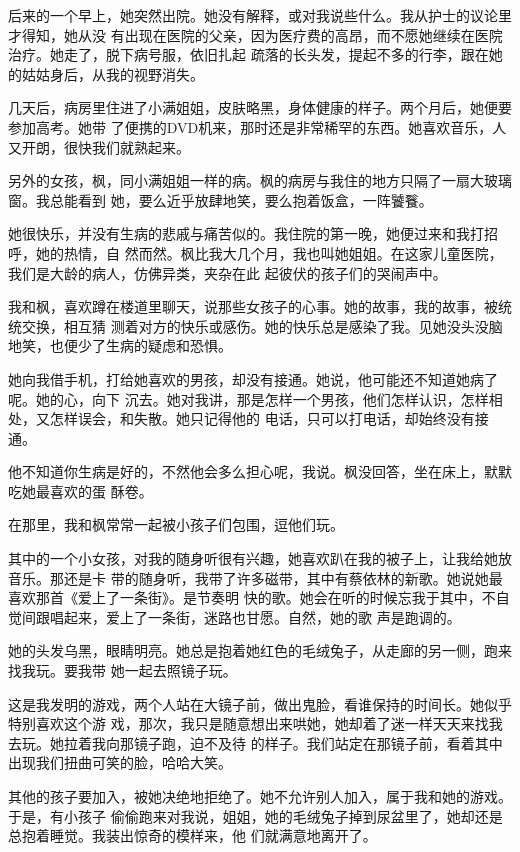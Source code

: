 \documentclass[12pt,a4paper]{article}
\begin{document}
		后来的一个早上，她突然出院。她没有解释，或对我说些什么。我从护士的议论里才得知，她从没
	有出现在医院的父亲，因为医疗费的高昂，而不愿她继续在医院治疗。她走了，脱下病号服，依旧扎起
	疏落的长头发，提起不多的行李，跟在她的姑姑身后，从我的视野消失。


		几天后，病房里住进了小满姐姐，皮肤略黑，身体健康的样子。两个月后，她便要参加高考。她带
	了便携的DVD机来，那时还是非常稀罕的东西。她喜欢音乐，人又开朗，很快我们就熟起来。


		另外的女孩，枫，同小满姐姐一样的病。枫的病房与我住的地方只隔了一扇大玻璃窗。我总能看到
	她，要么近乎放肆地笑，要么抱着饭盒，一阵饕餮。

		她很快乐，并没有生病的悲戚与痛苦似的。我住院的第一晚，她便过来和我打招呼，她的热情，自
	然而然。枫比我大几个月，我也叫她姐姐。在这家儿童医院，我们是大龄的病人，仿佛异类，夹杂在此
	起彼伏的孩子们的哭闹声中。


		我和枫，喜欢蹲在楼道里聊天，说那些女孩子的心事。她的故事，我的故事，被统统交换，相互猜
	测着对方的快乐或感伤。她的快乐总是感染了我。见她没头没脑地笑，也便少了生病的疑虑和恐惧。


		她向我借手机，打给她喜欢的男孩，却没有接通。她说，他可能还不知道她病了呢。她的心，向下
	沉去。她对我讲，那是怎样一个男孩，他们怎样认识，怎样相处，又怎样误会，和失散。她只记得他的
	电话，只可以打电话，却始终没有接通。


		他不知道你生病是好的，不然他会多么担心呢，我说。枫没回答，坐在床上，默默吃她最喜欢的蛋
	酥卷。


		在那里，我和枫常常一起被小孩子们包围，逗他们玩。


		其中的一个小女孩，对我的随身听很有兴趣，她喜欢趴在我的被子上，让我给她放音乐。那还是卡
	带的随身听，我带了许多磁带，其中有蔡依林的新歌。她说她最喜欢那首《爱上了一条街》。是节奏明
	快的歌。她会在听的时候忘我于其中，不自觉间跟唱起来，爱上了一条街，迷路也甘愿。自然，她的歌
	声是跑调的。


		她的头发乌黑，眼睛明亮。她总是抱着她红色的毛绒兔子，从走廊的另一侧，跑来找我玩。要我带
	她一起去照镜子玩。

		这是我发明的游戏，两个人站在大镜子前，做出鬼脸，看谁保持的时间长。她似乎特别喜欢这个游
	戏，那次，我只是随意想出来哄她，她却着了迷一样天天来找我去玩。她拉着我向那镜子跑，迫不及待
	的样子。我们站定在那镜子前，看着其中出现我们扭曲可笑的脸，哈哈大笑。


		其他的孩子要加入，被她决绝地拒绝了。她不允许别人加入，属于我和她的游戏。于是，有小孩子
	偷偷跑来对我说，姐姐，她的毛绒兔子掉到尿盆里了，她却还是总抱着睡觉。我装出惊奇的模样来，他
	们就满意地离开了。
\end{document}
